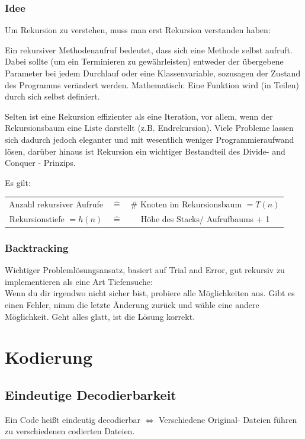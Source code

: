 \documentclass[fleqn]{scrartcl}
\begin{document}
\subsubsection{Idee}
Um Rekursion zu verstehen, muss man erst Rekursion verstanden haben:

Ein rekursiver Methodenaufruf bedeutet, dass sich eine Methode selbst aufruft.
Dabei sollte (um ein Terminieren zu gewährleisten) entweder der übergebene Parameter bei jedem Durchlauf oder eine Klassenvariable, sozusagen der \glqq Zustand \grqq des Programms verändert werden.
Mathematisch: Eine Funktion wird (in Teilen) durch sich selbst definiert.

Selten ist eine Rekursion effizienter als eine Iteration, vor allem, wenn der Rekursionsbaum eine Liste darstellt (z.B. Endrekursion). Viele Probleme lassen sich dadurch jedoch eleganter und mit wesentlich weniger Programmieraufwand lösen, darüber hinaus ist Rekursion ein wichtiger Bestandteil des \glqq Divide- and Conquer \grqq- Prinzips.

Es gilt:\\
\begin{tabular} {c c c}
Anzahl rekursiver Aufrufe & $\widehat{=}$ & \# Knoten im Rekursionsbaum $ = T(n)$\\
Rekursionstiefe $ = h(n)$ & $\widehat{=}$ & Höhe des Stacks/ Aufrufbaums + 1
\end{tabular}

\subsubsection{Backtracking}
Wichtiger Problemlösungsansatz, basiert auf Trial and Error, gut rekursiv zu implementieren als eine Art Tiefensuche:\\

Wenn du dir irgendwo nicht sicher bist, probiere alle Möglichkeiten aus. Gibt es einen Fehler, nimm die letzte Änderung zurück und wähle eine andere Möglichkeit. Geht alles glatt, ist die Lösung korrekt.

\newpage
\section{Kodierung}
\subsection{Eindeutige Decodierbarkeit}
Ein Code heißt eindeutig decodierbar $\Leftrightarrow$ Verschiedene Original- Dateien führen zu verschiedenen codierten Dateien.
\end{document}
